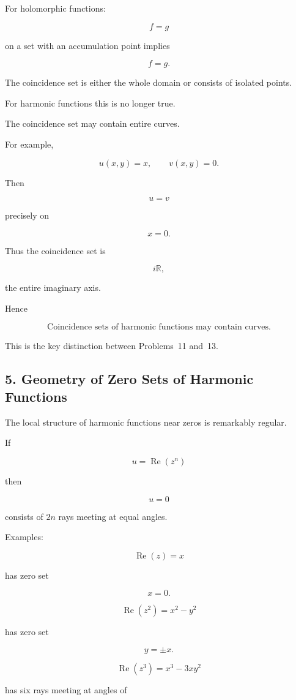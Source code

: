 \documentclass[12pt,a4paper]{article}
\theoremstyle{notespace}
\begin{document}
For holomorphic functions:

\[
f=g
\]

on a set with an accumulation point implies

\[
f=g.
\]

The coincidence set is either the whole domain or consists of isolated points.

For harmonic functions this is no longer true.

The coincidence set may contain entire curves.

For example,

\[
u(x,y)=x,
\qquad
v(x,y)=0.
\]

Then

\[
u=v
\]

precisely on

\[
x=0.
\]

Thus the coincidence set is

\[
i\mathbb R,
\]

the entire imaginary axis.

Hence

\[
\boxed{
	\text{Coincidence sets of harmonic functions may contain curves.}
}
\]

This is the key distinction between Problems~11 and~13.

\bigskip

\subsection{5. Geometry of Zero Sets of Harmonic Functions}

The local structure of harmonic functions near zeros is remarkably regular.

If

\[
u
=
\operatorname{Re}(z^n)
\]

then

\[
u=0
\]

consists of \(2n\) rays meeting at equal angles.

Examples:

\[
\operatorname{Re}(z)
=
x
\]

has zero set

\[
x=0.
\]

\[
\operatorname{Re}(z^2)
=
x^2-y^2
\]

has zero set

\[
y=\pm x.
\]

\[
\operatorname{Re}(z^3)
=
x^3-3xy^2
\]

has six rays meeting at angles of
\end{document}
